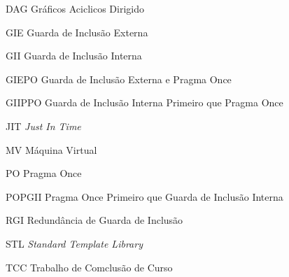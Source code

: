 \begin{siglas}
  \item[DAG]  Gráficos Aciclicos Dirigido
  \item[GIE]     Guarda de Inclusão Externa
  \item[GII]     Guarda de Inclusão Interna
  \item[GIEPO]   Guarda de Inclusão Externa e Pragma Once
  \item[GIIPPO]  Guarda de Inclusão Interna Primeiro que Pragma Once
  \item[JIT]     \textit{Just In Time}
  \item[MV]      Máquina Virtual 
  \item[PO]      Pragma Once
  \item[POPGII]  Pragma Once Primeiro que Guarda de Inclusão Interna
  \item[RGI]     Redundância de Guarda de Inclusão
  \item[STL]     \textit{Standard Template Library}
  \item[TCC]     Trabalho de Comclusão de Curso
\end{siglas}



